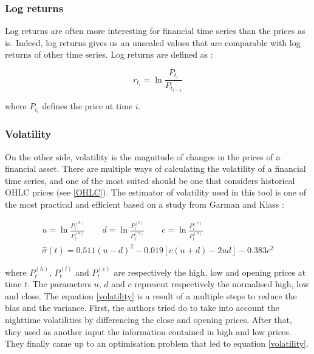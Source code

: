 \documentclass[11pt,a4paper,oneside]{book}
\begin{document}
\subsubsection{Log returns}\label{logret}

Log returns are often more interesting for financial time series than the prices as is. Indeed, log returns gives us an unscaled values that are comparable with log returns of other time series. Log returns are defined as :

\begin{equation}
r_{t_i} = \ln\frac{P_{t_i}}{P_{t_{i-1}}}
\end{equation}

where $P_{t_i}$ defines the price at time $i$. 


\subsubsection{Volatility}\label{vol}

On the other side, volatility is the magnitude of changes in the prices of a financial asset. There are multiple ways of calculating the volatility of a financial time series, and one of the most suited should be one that considers historical OHLC prices (see \ref{OHLC}). The estimator of volatility used in this tool is one of the most practical and efficient based on a study from Garman and Klass \cite{garm}:

\begin{equation}\label{volatility}
\begin{matrix}
u = \ln\frac{P_t^{(h)}}{P_t^{(o)}} \qquad
d = \ln\frac{P_t^{(l)}}{P_t^{(o)}} \qquad
c = \ln\frac{P_t^{(c)}}{P_t^{(o)}} \\
\hat{\sigma}\left ( t \right ) = 0.511\left ( u - d \right )^2 - 0.019\left [ c\left (u + d\right ) - 2ud\right ] - 0.383c^2
\end{matrix}
\end{equation}

where $P_t^{(h)}$, $P_t^{(l)}$ and $P_t^{(c)}$ are respectively the high, low and opening prices at time $t$. The parameters $u$, $d$ and $c$ represent respectively the normalised high, low and close. The equation \ref{volatility} is a result of a multiple steps to reduce the bias and the variance. First, the authors tried do to take into account the nighttime volatilities by differencing the close and opening prices. After that, they used as another input the information contained in high and low prices. They finally came up to an optimisation problem that led to equation \ref{volatility}. \cite{garm}
\end{document}
